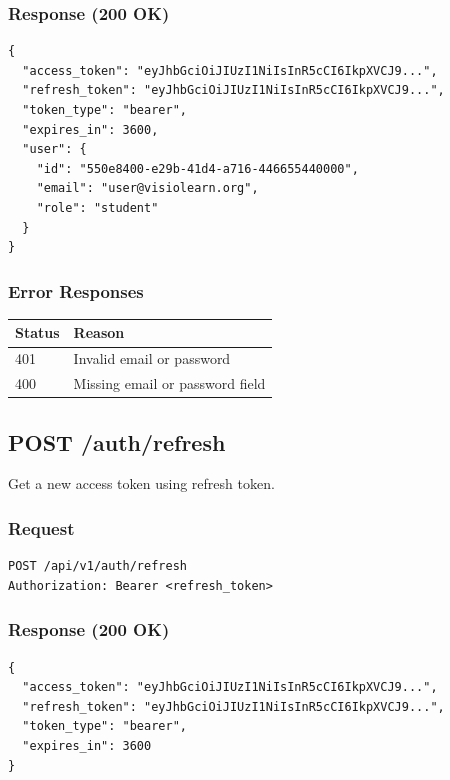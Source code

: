 \documentclass[12pt,a4paper,oneside]{article}
\begin{document}
\subsubsection{Response (200 OK)}

\begin{lstlisting}
{
  "access_token": "eyJhbGciOiJIUzI1NiIsInR5cCI6IkpXVCJ9...",
  "refresh_token": "eyJhbGciOiJIUzI1NiIsInR5cCI6IkpXVCJ9...",
  "token_type": "bearer",
  "expires_in": 3600,
  "user": {
    "id": "550e8400-e29b-41d4-a716-446655440000",
    "email": "user@visiolearn.org",
    "role": "student"
  }
}
\end{lstlisting}

\subsubsection{Error Responses}

\begin{table}[H]
\centering
\small
\begin{tabular}{|l|l|}
\hline
\textbf{Status} & \textbf{Reason} \\
\hline
401 & Invalid email or password \\
\hline
400 & Missing email or password field \\
\hline
\end{tabular}
\end{table}

\subsection{POST /auth/refresh}

Get a new access token using refresh token.

\subsubsection{Request}

\begin{lstlisting}
POST /api/v1/auth/refresh
Authorization: Bearer <refresh_token>
\end{lstlisting}

\subsubsection{Response (200 OK)}

\begin{lstlisting}
{
  "access_token": "eyJhbGciOiJIUzI1NiIsInR5cCI6IkpXVCJ9...",
  "refresh_token": "eyJhbGciOiJIUzI1NiIsInR5cCI6IkpXVCJ9...",
  "token_type": "bearer",
  "expires_in": 3600
}
\end{lstlisting}
\end{document}
